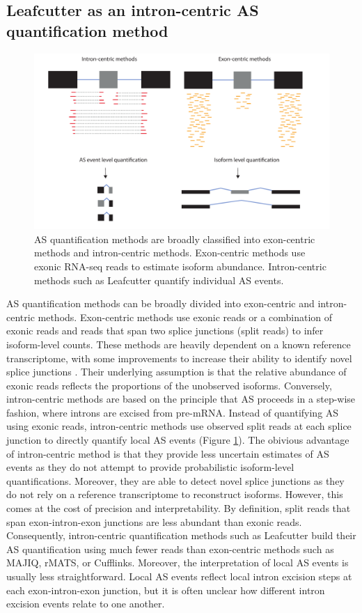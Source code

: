 \subsection{Leafcutter as an intron-centric AS quantification method}
\begin{figure}
    \centering
    \includegraphics[width=\textwidth]{intron_exon_centric}
    \caption{AS quantification methods are broadly classified into exon-centric methods and intron-centric methods. Exon-centric methods use exonic RNA-seq reads to estimate isoform abundance. Intron-centric methods such as Leafcutter quantify individual AS events. }
    \label{fig:intron_exon_centric}   
  \end{figure}
AS quantification methods can be broadly divided into exon-centric and intron-centric methods. Exon-centric methods use exonic reads or a combination of exonic reads and reads that span two splice junctions (split reads) to infer isoform-level counts. These methods are heavily dependent on a known reference transcriptome, with some improvements to increase their ability to identify novel splice junctions \cite{Vaquero-Garcia2016-dv}. Their underlying assumption is that the relative abundance of exonic reads reflects the proportions of the unobserved isoforms. Conversely, intron-centric methods are based on the principle that AS proceeds in a step-wise fashion, where introns are excised from pre-mRNA. Instead of quantifying AS using exonic reads, intron-centric methods use observed split reads at each splice junction to directly quantify local AS events (Figure \ref{fig:intron_exon_centric}). The obivious advantage of intron-centric method is that they provide less uncertain estimates of AS events as they do not attempt to provide probabilistic isoform-level quantifications. Moreover, they are able to detect novel splice junctions as they do not rely on a reference transcriptome to reconstruct isoforms. However, this comes at the cost of precision and interpretability. By definition, split reads that span exon-intron-exon junctions are less abundant than exonic reads. Consequently, intron-centric quantification methods such as Leafcutter build their AS quantification using much fewer reads than exon-centric methods such as MAJIQ, rMATS, or Cufflinks. Moreover, the interpretation of local AS events is usually less straightforward. Local AS events reflect local intron excision steps at each exon-intron-exon junction, but it is often unclear how different intron excision events relate to one another. \\

